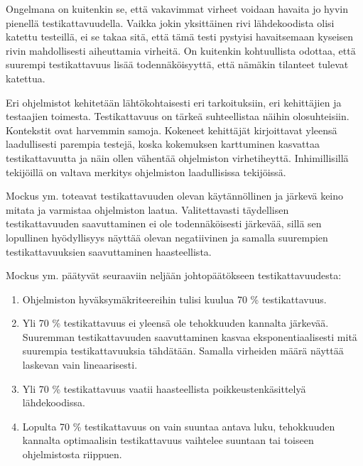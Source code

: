 \documentclass[finnish]{../tktltiki2}
\theoremstyle{definition}
\theoremstyle{remark}
\begin{document}
    Ongelmana on kuitenkin se, että vakavimmat virheet voidaan havaita jo hyvin pienellä testikattavuudella. Vaikka 
jokin yksittäinen rivi lähdekoodista olisi katettu testeillä, ei se takaa sitä, että tämä testi pystyisi havaitsemaan 
kyseisen rivin mahdollisesti aiheuttamia virheitä. On kuitenkin kohtuullista odottaa, että suurempi testikattavuus 
lisää todennäköisyyttä, että nämäkin tilanteet tulevat katettua.

    Eri ohjelmistot kehitetään lähtökohtaisesti eri tarkoituksiin, eri kehittäjien ja testaajien toimesta. 
Testikattavuus on tärkeä suhteellistaa näihin olosuhteisiin. Kontekstit ovat harvemmin samoja. Kokeneet kehittäjät 
kirjoittavat yleensä laadullisesti parempia testejä, koska kokemuksen karttuminen kasvattaa testikattavuutta ja näin 
ollen vähentää ohjelmiston virhetiheyttä. Inhimillisillä tekijöillä on valtava merkitys ohjelmiston laadullisissa 
tekijöissä.

    Mockus ym. toteavat testikattavuuden olevan käytännöllinen ja järkevä keino mitata ja varmistaa ohjelmiston laatua. 
Valitettavasti täydellisen testikattavuuden saavuttaminen ei ole todennäköisesti järkevää, sillä sen lopullinen 
hyödyllisyys näyttää olevan negatiivinen ja samalla suurempien testikattavuuksien saavuttaminen 
haasteellista.\newline

\noindent Mockus ym. päätyvät seuraaviin neljään johtopäätökseen testikattavuudesta:
    
\begin{enumerate}

    \item Ohjelmiston hyväksymäkriteereihin tulisi kuulua 70 \% testikattavuus.
          
    \item Yli 70 \% testikattavuus ei yleensä ole tehokkuuden kannalta järkevää. Suuremman testikattavuuden 
          saavuttaminen kasvaa eksponentiaalisesti mitä suurempia testikattavuuksia tähdätään. Samalla 
          virheiden määrä näyttää laskevan vain lineaarisesti.
          
    \item Yli 70 \% testikattavuus vaatii haasteellista poikkeustenkäsittelyä lähde\-koodissa.
    
    \item Lopulta 70 \% testikattavuus on vain suuntaa antava luku, tehokkuuden kannalta optimaalisin testikattavuus 
          vaihtelee suuntaan tai toiseen ohjelmistosta riippuen.

\end{enumerate}
\end{document}
